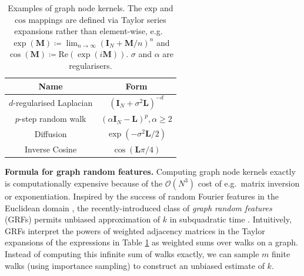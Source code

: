 \begin{table}[H]
\small
\centering
\begin{tabular}{cc}
\toprule
Name & Form  \\
\midrule
$d$-regularised Laplacian & $(\mathbf{I}_{N} + \sigma^2 \mathbf{L})^{-d}$   \\
$p$-step random walk & $(\alpha \mathbf{I}_{N} - \mathbf{L})^{p}, \alpha \geq 2$  \\
Diffusion   & $\exp(- \sigma^2 \mathbf{L}/2) $   \\
Inverse Cosine & $\cos \left(\mathbf{L} \pi /4 \right)$ \\
\bottomrule
\end{tabular} \vspace{3mm}
\caption{Examples of graph node kernels. The $\mathrm{exp}$ and $\mathrm{cos}$ mappings are defined via Taylor series expansions rather than element-wise, e.g.~$\exp(\mathbf{M}) \coloneqq \lim_{n \to \infty} (\mathbf{I}_N + \mathbf{M}/n)^n$ and $\cos(\mathbf{M}) \coloneqq \textrm{Re}(\exp(i \mathbf{M}))$. $\sigma$ and $\alpha$ are regularisers.}\label{tab:taylor_expansions}
\normalsize
\end{table}

\textbf{Formula for graph random features.} Computing graph node kernels exactly is computationally expensive because of the $\mathcal{O}(N^3)$ cost of e.g.~matrix inversion or exponentiation. 
Inspired by the success of random Fourier features in the Euclidean domain \citep{rahimi2007random}, the recently-introduced class of \emph{graph random features} (GRFs) permits unbiased approximation of $k$ in subquadratic time \citep{graph_features,reid2023universal}.
Intuitively, GRFs interpret the powers of weighted adjacency matrices in the Taylor expansions of the expressions in Table \ref{tab:taylor_expansions} as weighted sums over walks on a graph. 
Instead of computing this infinite sum of walks exactly, we can sample $m$ finite walks (using importance sampling) to construct an unbiased estimate of $k$. 


